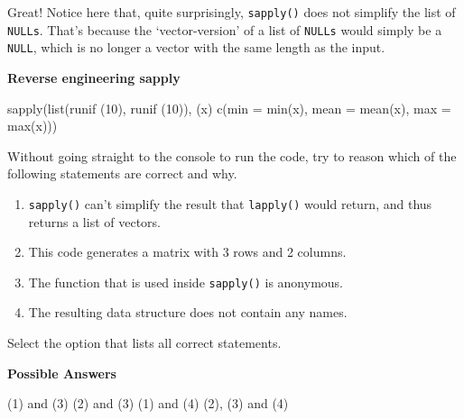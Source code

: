 \documentclass[]{article}
\providecommand{\tightlist}{%
  \setlength{\itemsep}{0pt}\setlength{\parskip}{0pt}}
\newcommand{\hlnum}[1]{\textcolor[rgb]{0.816,0.125,0.439}{#1}}%
\newcommand{\hlstr}[1]{\textcolor[rgb]{0.251,0.627,0.251}{#1}}%
\newcommand{\hlstd}[1]{\textcolor[rgb]{0.251,0.251,0.251}{#1}}%
\newcommand{\hlkwc}[1]{\textcolor[rgb]{0.251,0.251,0.251}{#1}}%
\newcommand{\hlkwd}[1]{\textcolor[rgb]{0.878,0.439,0.125}{#1}}%
\newenvironment{Shaded}{\begin{myshaded}}{\end{myshaded}}
\newcommand{\KeywordTok}[1]{\hlkwd{#1}}
\newcommand{\DataTypeTok}[1]{\hlkwc{#1}}
\newcommand{\DecValTok}[1]{\hlnum{#1}}
\newcommand{\StringTok}[1]{\hlstr{#1}}
\newcommand{\NormalTok}[1]{\hlstd{#1}}
\begin{document}
Great! Notice here that, quite surprisingly, \texttt{sapply()} does not
simplify the list of \texttt{NULL\textquotesingle{}s}. That's because
the `vector-version' of a list of \texttt{NULL\textquotesingle{}s} would
simply be a \texttt{NULL}, which is no longer a vector with the same
length as the input.

\textbf{Reverse engineering sapply}

\begin{Shaded}
\begin{Highlighting}[]
\KeywordTok{sapply}\NormalTok{(}\KeywordTok{list}\NormalTok{(}\KeywordTok{runif}\NormalTok{ (}\DecValTok{10}\NormalTok{), }\KeywordTok{runif}\NormalTok{ (}\DecValTok{10}\NormalTok{)), }
       \NormalTok{(x) }\KeywordTok{c}\NormalTok{(}\DataTypeTok{min =} \KeywordTok{min}\NormalTok{(x), }\DataTypeTok{mean =} \KeywordTok{mean}\NormalTok{(x), }\DataTypeTok{max =} \KeywordTok{max}\NormalTok{(x)))}
\end{Highlighting}
\end{Shaded}

Without going straight to the console to run the code, try to reason
which of the following statements are correct and why.

\begin{enumerate}
\def\labelenumi{(\arabic{enumi})}
\tightlist
\item
  \texttt{sapply()} can't simplify the result that \texttt{lapply()}
  would return, and thus returns a list of vectors.
\item
  This code generates a matrix with 3 rows and 2 columns.
\item
  The function that is used inside \texttt{sapply()} is anonymous.
\item
  The resulting data structure does not contain any names.
\end{enumerate}

Select the option that lists all correct statements.

\textbf{Possible Answers}

\begin{Shaded}
\begin{Highlighting}[]
\OperatorTok{*}\StringTok{ }\NormalTok{(}\DecValTok{1}\NormalTok{) }\KeywordTok{and}\NormalTok{ (}\DecValTok{3}\NormalTok{)}
\OperatorTok{*}\StringTok{ }\NormalTok{(}\DecValTok{2}\NormalTok{) }\KeywordTok{and}\NormalTok{ (}\DecValTok{3}\NormalTok{)}
\OperatorTok{*}\StringTok{ }\NormalTok{(}\DecValTok{1}\NormalTok{) }\KeywordTok{and}\NormalTok{ (}\DecValTok{4}\NormalTok{)}
\OperatorTok{*}\StringTok{ }\NormalTok{(}\DecValTok{2}\NormalTok{), (}\DecValTok{3}\NormalTok{) }\KeywordTok{and}\NormalTok{ (}\DecValTok{4}\NormalTok{)}
\end{Highlighting}
\end{Shaded}
\end{document}
